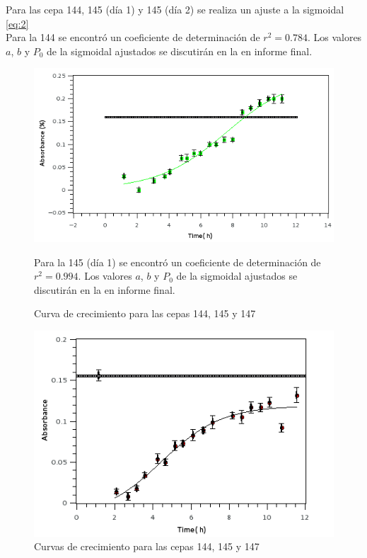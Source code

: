 \documentclass[%
 reprint,
 amsmath,amssymb,
 aps,
]{revtex4-2}
\begin{document}
 Para las cepa 144, 145 (d\'{i}a 1) y 145 (d\'{i}a 2) se realiza un ajuste a la sigmoidal \eqref{eq:2}\\
 Para la 144 se encontr\'{o} un coeficiente de determinaci\'{o}n de $r^2=0.784$. Los valores $a$, $b$ y $P_{0}$ de la sigmoidal ajustados se discutir\'{a}n en la en informe final.
\begin{figure}[h]
\includegraphics[width=\linewidth]{curvas/gra144.png}
  \caption{Curva de crecimiento para las cepas 144, 145 y 147}
  \label{fig:cur2}
   Para la 145  (d\'{i}a 1) se encontr\'{o} un coeficiente de determinaci\'{o}n de $r^2=0.994$.
   Los valores $a$, $b$ y $P_{0}$ de la sigmoidal ajustados se discutir\'{a}n en la en informe final.
\end{figure}
\begin{figure}[h]
 \includegraphics[width=\linewidth]{curvas/gra145dia1.png}
  \caption{Curvas de crecimiento para las cepas 144, 145 y 147}
  \label{fig:cur3}
\end{figure}
\end{document}
